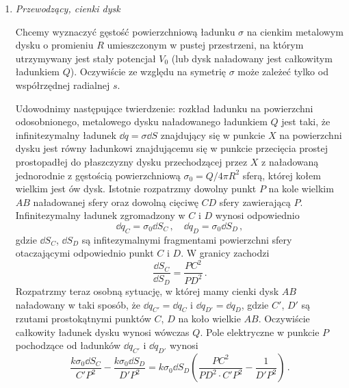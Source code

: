 \documentclass[../main.tex]{subfiles}
\begin{document}
\begin{enumerate}
    \item \textit{Przewodzący, cienki dysk}
    \medskip
    
    Chcemy wyznaczyć gęstość powierzchniową ładunku \(\sigma\) na cienkim metalowym dysku o
    promieniu \(R\) umieszczonym w pustej przestrzeni, na którym utrzymywany jest stały potencjał
    \(V_0\) (lub dysk naładowany jest całkowitym ładunkiem \(Q\)). Oczywiście ze względu na symetrię
    \(\sigma\) może zależeć tylko od współrzędnej radialnej \(s\).
    \medskip
    
    Udowodnimy następujące twierdzenie: rozkład ładunku na powierzchni odosobnionego, metalowego
    dysku naładowanego ładunkiem \(Q\) jest taki, że infinitezymalny ładunek \(\dd{q}=\sigma
    \dd{S}\) znajdujący się w punkcie \(X\) na powierzchni dysku jest równy ładunkowi znajdującemu
    się w punkcie przecięcia prostej prostopadłej do płaszczyzny dysku przechodzącej przez \(X\) z
    naładowaną jednorodnie z gęstością powierzchniową \(\sigma_0=Q/4\pi R^2\) sferą, której kołem
    wielkim jest ów dysk. Istotnie rozpatrzmy dowolny punkt \(P\) na kole wielkim \(AB\) naładowanej
    sfery oraz dowolną cięciwę \(CD\) sfery zawierającą \(P\). Infinitezymalny ładunek zgromadzony w
    \(C\) i \(D\) wynosi odpowiednio
    \begin{equation*}
        \dd{q}_C=\sigma_0\dd{S}_C\,,\quad \dd{q}_D=\sigma_0\dd{S}_D\,,
    \end{equation*}
    gdzie \(\dd{S}_C\), \(\dd{S}_D\) są infitezymalnymi fragmentami powierzchni sfery otaczającymi
    odpowiednio punkt \(C\) i \(D\). W granicy zachodzi
    \begin{equation*}
        \frac{\dd{S}_C}{\dd{S_D}}=\frac{PC^2}{PD^2}\,.
    \end{equation*}
    Rozpatrzmy teraz osobną sytuację, w której mamy cienki dysk \(AB\) naładowany w taki sposób, że
    \(\dd{q}_{C'}=\dd{q}_C\) i \(\dd{q}_{D'}=\dd{q}_D\), gdzie \(C'\), \(D'\) są rzutami
    prostokątnymi punktów \(C\), \(D\) na koło wielkie \(AB\). Oczywiście całkowity ładunek dysku
    wynosi wówczas \(Q\). Pole elektryczne w punkcie \(P\) pochodzące od ładunków \(\dd{q}_{C'}\) i
    \(\dd{q}_{D'}\) wynosi
    \begin{equation*}
        \frac{k\sigma_0\dd{S}_C}{C'P^2}-\frac{k\sigma_0\dd{S}_D}{D'P^2}=k\sigma_0\dd{S}_D\left(\frac{PC^2}{PD^2\cdot C'P^2}-\frac{1}{D'P^2}\right)\,.
    \end{equation*}
    

\end{enumerate}
\end{document}
